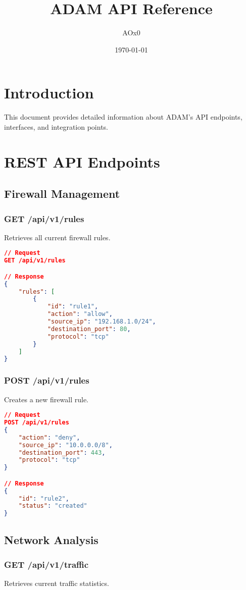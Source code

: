 \documentclass{article}
\title{ADAM API Reference}
\author{AOx0}
\date{\today}
\begin{document}
\maketitle

\section{Introduction}
This document provides detailed information about ADAM's API endpoints, interfaces, and integration points.

\section{REST API Endpoints}

\subsection{Firewall Management}
\subsubsection{GET /api/v1/rules}
Retrieves all current firewall rules.

\begin{lstlisting}[language=json]
// Request
GET /api/v1/rules

// Response
{
    "rules": [
        {
            "id": "rule1",
            "action": "allow",
            "source_ip": "192.168.1.0/24",
            "destination_port": 80,
            "protocol": "tcp"
        }
    ]
}
\end{lstlisting}

\subsubsection{POST /api/v1/rules}
Creates a new firewall rule.

\begin{lstlisting}[language=json]
// Request
POST /api/v1/rules
{
    "action": "deny",
    "source_ip": "10.0.0.0/8",
    "destination_port": 443,
    "protocol": "tcp"
}

// Response
{
    "id": "rule2",
    "status": "created"
}
\end{lstlisting}

\subsection{Network Analysis}
\subsubsection{GET /api/v1/traffic}
Retrieves current traffic statistics.
\end{document}
